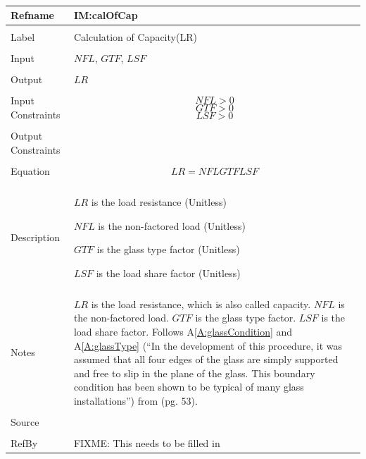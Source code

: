\documentclass[12pt]{article}
\begin{document}
~\newline
\noindent \begin{minipage}{\textwidth}
\begin{tabular}{p{} p{}}
\toprule \textbf{Refname} & \textbf{IM:calOfCap}
\label{IM:calOfCap}
\\ \midrule \\
Label & Calculation of Capacity(LR)
\\ \midrule \\
Input & $NFL$, $GTF$, $LSF$
\\ \midrule \\
Output & $LR$
\\ \midrule \\
Input Constraints & \begin{dmath}
                    NFL>0
                    \end{dmath}
                    \begin{dmath}
                    GTF>0
                    \end{dmath}
                    \begin{dmath}
                    LSF>0
                    \end{dmath}
\\ \midrule \\
Output Constraints & 
\\ \midrule \\
Equation & \begin{dmath}
           LR=NFL GTF LSF
           \end{dmath}
\\ \midrule \\
Description & \begin{symbDescription}
              \item{$LR$ is the load resistance (Unitless)}
              \item{$NFL$ is the non-factored load (Unitless)}
              \item{$GTF$ is the glass type factor (Unitless)}
              \item{$LSF$ is the load share factor (Unitless)}
              \end{symbDescription}
\\ \midrule \\
Notes & $LR$ is the load resistance, which is also called capacity. $NFL$ is the non-factored load. $GTF$ is the glass type factor. $LSF$ is the load share factor. Follows A\ref{A:glassCondition} and A\ref{A:glassType} (``In the development of this procedure, it was assumed that all four edges of the glass are simply supported and free to slip in the plane of the glass. This boundary condition has been shown to be typical of many glass installations'') from \cite{astm2009} (pg. 53).
\\ \midrule \\
Source & 
\\ \midrule \\
RefBy & FIXME: This needs to be filled in
\\ \bottomrule \end{tabular}
\end{minipage}\\
\end{document}

